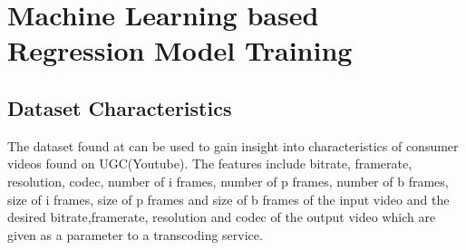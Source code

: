\documentclass[letterpaper,12pt,titlepage,oneside,final]{report}
\begin{document}


\chapter{Machine Learning based Regression Model Training}
    \label{ml_chap}
    \section{Dataset Characteristics}
        The dataset found at \cite{UCIM53:online} can be used to gain insight into characteristics of consumer videos found on UGC(Youtube). The features include bitrate, framerate, resolution, codec, number of i frames, number of p frames, number of b frames, size of i frames, size of p frames and size of b frames of the input video and the desired bitrate,framerate, resolution and codec of the output video which are given as a parameter to a transcoding service.
\end{document}
